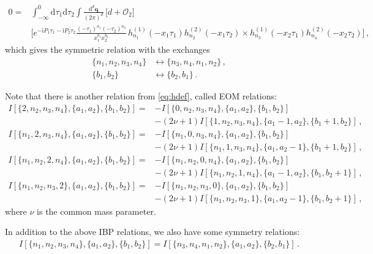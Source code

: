 \documentclass[%
 reprint,
 amsmath,amssymb,
 aps,
prd,
]{revtex4-2}
\def\di{{\mathrm{d}}}
\def\ii{\mathrm{i}}
\begin{document}
\begin{widetext}
\begin{align}
	0 ={}& \int_{-\infty}^0 \di\tau_1\di\tau_2\int \frac{\di^d \bm q}{(2\pi)^d}\,
	\Big[d+\mathcal{O}_2\Big]\nonumber\\
	&\Bigg[
	e^{-\ii P_1\tau_1-\ii P_2\tau_2}
	\frac{(-\tau_1)^{a_1}(-\tau_2)^{a_2}}{x_1^{b_1}x_2^{b_2}}\,
	h_{n_1}^{(1)}(-x_1\tau_1)h_{n_2}^{(2)}(-x_1\tau_2) \times h_{n_3}^{(1)}(-x_2\tau_1)h_{n_4}^{(2)}(-x_2\tau_2)\Bigg]\,, \label{eq:momIBP_qk_chainrule}
\end{align}
which gives the symmetric relation with the exchanges
\begin{align}
	\{n_1,n_2,n_3,n_4\} &\leftrightarrow \{n_3,n_4,n_1,n_2\}\,, \nonumber\\
	\{b_1,b_2\} &\leftrightarrow \{b_2,b_1\}\,. \nonumber
\end{align}

Note that there is another relation from \eqref{eq:hdef}, called EOM relations:
\begin{align}
	I[\{2,n_2,n_3,n_4\},\{a_1,a_2\},\{b_1,b_2\}] = & - I[\{0,n_2,n_3,n_4\},\{a_1,a_2\},\{b_1,b_2\}]\nonumber      \\
   & - (2\nu+1) I[\{1,n_2,n_3,n_4\},\{a_1-1,a_2\},\{b_1+1,b_2\}]\,, \\
	I[\{n_1,2,n_3,n_4\},\{a_1,a_2\},\{b_1,b_2\}] = & - I[\{n_1,0,n_3,n_4\},\{a_1,a_2\},\{b_1,b_2\}]\nonumber      \\
& - (2\nu+1) I[\{n_1,1,n_3,n_4\},\{a_1,a_2-1\},\{b_1+1,b_2\}]\,, \\
	I[\{n_1,n_2,2,n_4\},\{a_1,a_2\},\{b_1,b_2\}] = & - I[\{n_1,n_2,0,n_4\},\{a_1,a_2\},\{b_1,b_2\}]\nonumber      \\
     & - (2\nu+1) I[\{n_1,n_2,1,n_4\},\{a_1-1,a_2\},\{b_1,b_2+1\}]\,, \\
	I[\{n_1,n_2,n_3,2\},\{a_1,a_2\},\{b_1,b_2\}] = & - I[\{n_1,n_2,n_3,0\},\{a_1,a_2\},\{b_1,b_2\}]\nonumber      \\
     & - (2\nu+1) I[\{n_1,n_2,n_3,1\},\{a_1,a_2-1\},\{b_1,b_2+1\}]\,,
\end{align}
where $\nu$ is the common mass parameter.

In addition to the above IBP relations, we also have some symmetry relations:
\begin{align}
	I[\{n_1,n_2,n_3,n_4\},\{a_1,a_2\},\{b_1,b_2\}] = I[\{n_3,n_4,n_1,n_2\},\{a_1,a_2\},\{b_2,b_1\}]\,.
\end{align}


\end{widetext}
\end{document}
